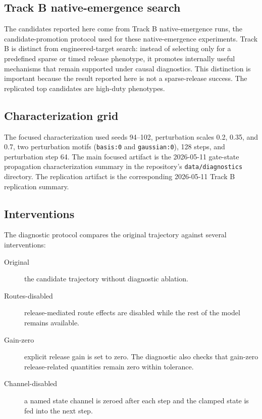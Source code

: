 \documentclass[11pt]{article}
\begin{document}
\subsection{Track B native-emergence search}

The candidates reported here come from Track B native-emergence runs, the
candidate-promotion protocol used for these native-emergence experiments. Track
B is distinct from engineered-target search: instead of selecting only for a
predefined sparse or timed release phenotype, it promotes internally useful
mechanisms that remain supported under causal diagnostics. This distinction is
important because the result reported here is not a sparse-release success.
The replicated top candidates are high-duty phenotypes.

\subsection{Characterization grid}

The focused characterization used seeds 94--102, perturbation scales
0.2, 0.35, and 0.7, two perturbation motifs (\texttt{basis:0} and
\texttt{gaussian:0}), 128 steps, and perturbation step 64. The main focused
artifact is the 2026-05-11 gate-state propagation characterization summary in
the repository's \texttt{data/diagnostics} directory. The replication artifact
is the corresponding 2026-05-11 Track B replication summary.

\subsection{Interventions}

The diagnostic protocol compares the original trajectory against several
interventions:

\begin{description}
  \item[Original] the candidate trajectory without diagnostic ablation.
  \item[Routes-disabled] release-mediated route effects are disabled while the
  rest of the model remains available.
  \item[Gain-zero] explicit release gain is set to zero. The diagnostic also
  checks that gain-zero release-related quantities remain zero within
  tolerance.
  \item[Channel-disabled] a named state channel is zeroed after each step and
  the clamped state is fed into the next step.
\end{description}
\end{document}
